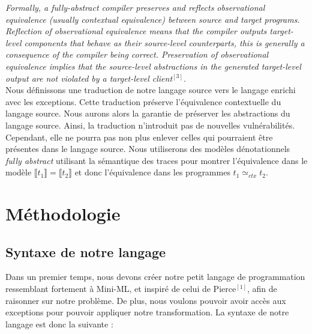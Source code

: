 \documentclass[11pt, a4paper, notitlepage]{article}
\newcommand\tab{{\hspace*{12.5mm}}}
\begin{document}
\tab \textit{Formally, a fully-abstract compiler preserves and reflects observational equivalence (usually contextual equivalence) between source and target programs. Reflection of observational equivalence means that the compiler outputs target-level components that behave as their source-level counterparts, this is generally a consequence of the compiler being correct. Preservation of observational equivalence implies that the source-level abstractions in the generated target-level output are not violated by a target-level client$^{[3]}$.}\\
\tab Nous définissons une traduction de notre langage source vers le langage enrichi avec les exceptions. Cette traduction préserve l’équivalence contextuelle du langage source. Nous aurons alors la garantie de préserver les abstractions du langage source. Ainsi, la traduction n'introduit pas de nouvelles vulnérabilités. Cependant, elle ne pourra pas non plus enlever celles qui pourraient être présentes dans le langage source. Nous utiliserons des modèles dénotationnels \textit{fully abstract} utilisant la sémantique des traces pour montrer l’équivalence dans le modèle $\llbracket t_1 \rrbracket = \llbracket t_2 \rrbracket$ et donc l’équivalence dans les programmes $t_1 \simeq_{ctx} t_2$.

\section{Méthodologie}
\subsection{Syntaxe de notre langage}
\tab Dans un premier temps, nous devons créer notre petit langage de programmation ressemblant fortement à Mini-ML, et inspiré de celui de Pierce$^{[1]}$, afin de raisonner sur notre problème. De plus, nous voulons pouvoir avoir accès aux exceptions pour pouvoir appliquer notre transformation. La syntaxe de notre langage est donc la suivante :
\end{document}
